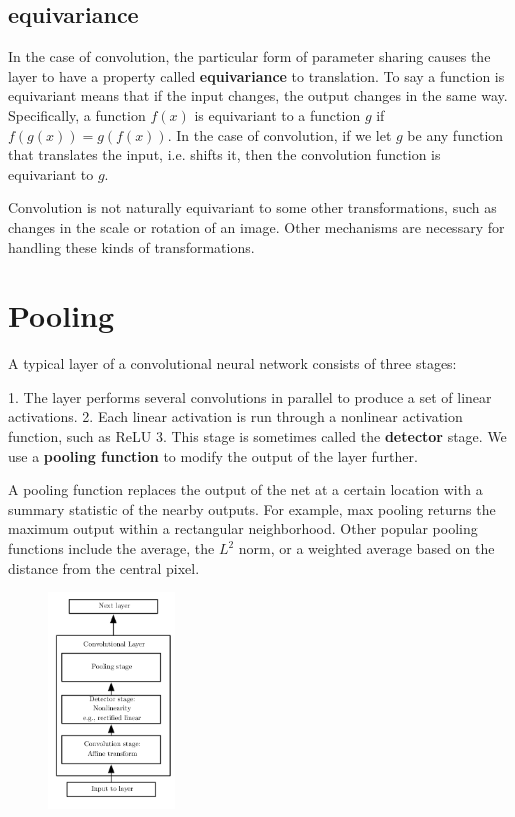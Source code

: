 \documentclass[onecolumn, letterpaper, 12pt]{report}
\begin{document}
\subsection{equivariance}

In the case of convolution, the particular form of parameter sharing causes the layer to have a property called \textbf{equivariance} to translation. To say a function is equivariant means that if the input changes, the output changes in the same way. Specifically, a function $f(x)$ is equivariant to a function $g$ if $f(g(x)) = g(f(x))$. In the case of convolution, if we let $g$ be any function that translates the input, i.e. shifts it, then the convolution function is equivariant to $g$. 

Convolution is not naturally equivariant to some other transformations, such as changes in the scale or rotation of an image. Other mechanisms are necessary for handling these kinds of transformations. 

\section{Pooling}

A typical layer of a convolutional neural network consists of three stages: 

1. The layer performs several convolutions in parallel to produce a set of linear activations.
2. Each linear activation is run through a nonlinear activation function, such as ReLU
3. This stage is sometimes called the \textbf{detector} stage. We use a \textbf{pooling function} to modify the output of the layer further. 

A pooling function replaces the output of the net at a certain location with a summary statistic of the nearby outputs. For example, max pooling returns the maximum output within a rectangular neighborhood. Other popular pooling functions include the average, the $L^2$ norm, or a weighted average based on the distance from the central pixel. 

\begin{figure}[h]
  \centering
  \includegraphics[width=0.3\textwidth]{conv_layer.png}
\end{figure}
\end{document}
